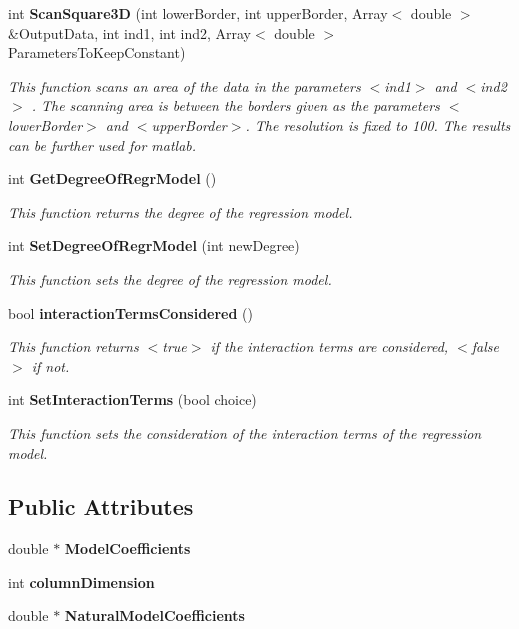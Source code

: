 \begin{CompactItemize}
int {\bf Scan\-Square3D} (int lower\-Border, int upper\-Border, Array$<$ double $>$ \&Output\-Data, int ind1, int ind2, Array$<$ double $>$ Parameters\-To\-Keep\-Constant)
\begin{CompactList}\small\item\em This function scans an area of the data in the parameters $<$ind1$>$ and $<$ind2$>$ . The scanning area is between the borders given as the parameters $<$lower\-Border$>$ and $<$upper\-Border$>$. The resolution is fixed to 100. The results can be further used for matlab. \item\end{CompactList}\item 
int {\bf Get\-Degree\-Of\-Regr\-Model} ()
\begin{CompactList}\small\item\em This function returns the degree of the regression model. \item\end{CompactList}\item 
int {\bf Set\-Degree\-Of\-Regr\-Model} (int new\-Degree)
\begin{CompactList}\small\item\em This function sets the degree of the regression model. \item\end{CompactList}\item 
bool {\bf interaction\-Terms\-Considered} ()
\begin{CompactList}\small\item\em This function returns $<$true$>$ if the interaction terms are considered, $<$false$>$ if not. \item\end{CompactList}\item 
int {\bf Set\-Interaction\-Terms} (bool choice)
\begin{CompactList}\small\item\em This function sets the consideration of the interaction terms of the regression model. \item\end{CompactList}\end{CompactItemize}
\subsection*{Public Attributes}
\begin{CompactItemize}
\item 
double $\ast$ {\bf Model\-Coefficients}\label{classRegrApp_9db233f325bc0ae754a648ca801302d4}

\item 
int {\bf column\-Dimension}\label{classRegrApp_e46084979221a0f9f78bcd2775fcc376}

\item 
double $\ast$ {\bf Natural\-Model\-Coefficients}\label{classRegrApp_f6e9ebf9f47598a0b99ff7b5095b5461}

\end{CompactItemize}


